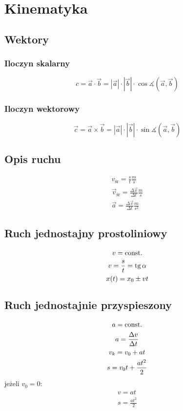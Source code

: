 \chapter{Kinematyka}

\section{Wektory}

\subsection{Iloczyn skalarny}
\begin{equation}
  c = \vec a \cdot \vec b = |\vec a| \cdot |\vec b| \cdot \cos\measuredangle(\vec a, \vec b)
\end{equation}

\subsection{Iloczyn wektorowy}
\begin{equation}
  \vec c = \vec a \times \vec b =|\vec a| \cdot |\vec b| \cdot \sin\measuredangle(\vec a, \vec b)
\end{equation}

\section{Opis ruchu}
\begin{gather*}
  v_\text{śr} = \frac s t \unit{\frac m s}\\
  \vec v_\text{śr} = \frac{\Delta \vec x}{\Delta t} \unit{\frac m s}\\
  \vec a = \frac{\Delta \vec v}{\Delta t} \unit{\frac{m}{s^2}}
\end{gather*}

\section{Ruch jednostajny prostoliniowy}
\begin{gather*}
  v = \operatorname{const.}\\
  v = \frac s t = \operatorname{tg} \alpha\\
  x(t) = x_0 \pm vt
\end{gather*}

\section{Ruch jednostajnie przyspieszony}
\begin{gather*}
  a = \operatorname{const.}\\
  a = \frac{\Delta v}{\Delta t}\\
  v_k = v_0 + at\\
  s = v_0 t + \frac{a t^2}{2}
\end{gather*}
jeżeli $v_0 = 0$:
\begin{gather*}
  v = at\\
  s = \frac{a t^2}{2}
\end{gather*}

